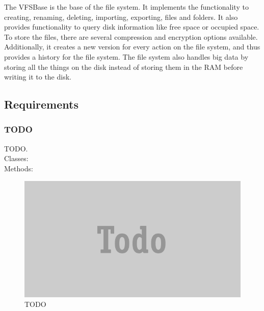 \documentclass[JCDReport.tex]{subfiles}
\begin{document}
The VFSBase is the base of the file system. It implements the functionality to creating, renaming, deleting, importing, exporting, files and folders. It also provides functionality to query disk information like free space or occupied space. To store the files, there are several compression and encryption options available. Additionally, it creates a new version for every action on the file system, and thus provides a history for the file system. The file system also handles big data by storing all the things on the disk instead of storing them in the RAM before writing it to the disk.

\subsection{Requirements}





% 
\subsubsection{TODO}
TODO.\\
Classes:\\
Methods:\\
\begin{figure}[h!]
	\centering
	\includegraphics[scale=1]{Images/todo.png} 
	\caption{TODO}
\end{figure}

% 
\end{document}
